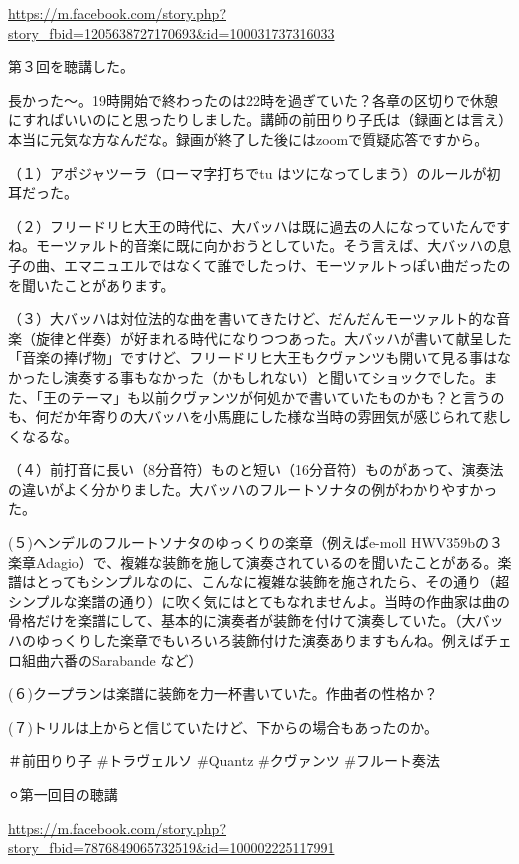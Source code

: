\documentclass[facebook_diary.tex]{subfiles}
\begin{document}
\url{https://m.facebook.com/story.php?story_fbid=1205638727170693&id=100031737316033}




第３回を聴講した。

長かった〜。19時開始で終わったのは22時を過ぎていた？各章の区切りで休憩にすればいいのにと思ったりしました。講師の前田りり子氏は（録画とは言え）本当に元気な方なんだな。録画が終了した後にはzoomで質疑応答ですから。


（１）アポジャツーラ（ローマ字打ちでtu はツになってしまう）のルールが初耳だった。

（２）フリードリヒ大王の時代に、大バッハは既に過去の人になっていたんですね。モーツァルト的音楽に既に向かおうとしていた。そう言えば、大バッハの息子の曲、エマニュエルではなくて誰でしたっけ、モーツァルトっぽい曲だったのを聞いたことがあります。

（３）大バッハは対位法的な曲を書いてきたけど、だんだんモーツァルト的な音楽（旋律と伴奏）が好まれる時代になりつつあった。大バッハが書いて献呈した「音楽の捧げ物」ですけど、フリードリヒ大王もクヴァンツも開いて見る事はなかったし演奏する事もなかった（かもしれない）と聞いてショックでした。また、「王のテーマ」も以前クヴァンツが何処かで書いていたものかも？と言うのも、何だか年寄りの大バッハを小馬鹿にした様な当時の雰囲気が感じられて悲しくなるな。

（４）前打音に長い（8分音符）ものと短い（16分音符）ものがあって、演奏法の違いがよく分かりました。大バッハのフルートソナタの例がわかりやすかった。

(５)ヘンデルのフルートソナタのゆっくりの楽章（例えばe-moll HWV359bの３楽章Adagio）で、複雑な装飾を施して演奏されているのを聞いたことがある。楽譜はとってもシンプルなのに、こんなに複雑な装飾を施されたら、その通り（超シンプルな楽譜の通り）に吹く気にはとてもなれませんよ。当時の作曲家は曲の骨格だけを楽譜にして、基本的に演奏者が装飾を付けて演奏していた。（大バッハのゆっくりした楽章でもいろいろ装飾付けた演奏ありますもんね。例えばチェロ組曲六番のSarabande など）

(６)クープランは楽譜に装飾を力一杯書いていた。作曲者の性格か？

(７)トリルは上からと信じていたけど、下からの場合もあったのか。


＃前田りり子 \#トラヴェルソ \#Quantz \#クヴァンツ \#フルート奏法


⚪︎第一回目の聴講

\url{https://m.facebook.com/story.php?story_fbid=7876849065732519&id=100002225117991}
\end{document}
